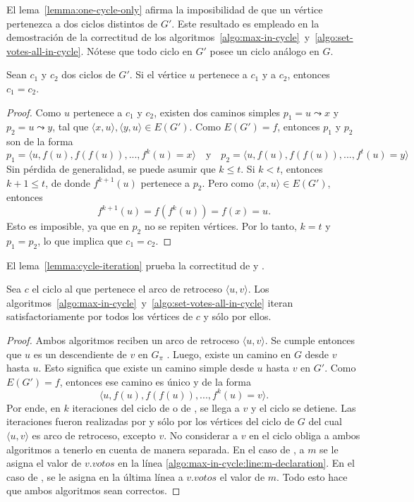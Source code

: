 El lema~\ref{lemma:one-cycle-only} afirma la imposibilidad de que un v\'ertice pertenezca a dos ciclos distintos de $G'$.  Este resultado es empleado en la demostraci\'on de la correctitud de los algoritmos~\ref{algo:max-in-cycle}~y~\ref{algo:set-votes-all-in-cycle}. N\'otese que todo ciclo en $G'$ posee un ciclo an\'alogo en $G$.
\begin{lemma}\label{lemma:one-cycle-only}
    Sean $c_1$ y $c_2$ dos ciclos de $G'$. Si el v\'ertice $u$ pertenece a $c_1$ y  a $c_2$, entonces $c_1 = c_2$.
\end{lemma}

\begin{proof}
    Como $u$ pertenece a $c_1$ y $c_2$, existen dos caminos simples $p_1 = u \leadsto x$ y $p_2 = u \leadsto y$, tal que $\langle x, u \rangle, \langle y, u \rangle \in E(G')$. Como $E(G') = f$, entonces $p_1$ y $p_2$ son de la forma
    $$
    p_1 = \langle u, f(u), f(f(u)), ..., f^k(u) = x \rangle \quad \text{y} \quad p_2 = \langle u, f(u), f(f(u)), ..., f^t(u) = y \rangle
    $$
    Sin p\'erdida de generalidad, se puede asumir que $k \leq t$. Si $k < t$, entonces $k+1 \leq t$, de donde $f^{k+1}(u)$ pertenece a $p_2$. Pero como $\langle x, u \rangle \in E(G')$, entonces
    $$
    f^{k+1}(u) = f(f^k(u)) = f(x) = u.
    $$
    Esto es imposible, ya que en $p_2$ no se repiten v\'ertices. Por lo tanto, $k = t$ y $p_1 = p_2$, lo que implica que $c_1 = c_2$.
\end{proof}

El lema~\ref{lemma:cycle-iteration} prueba la correctitud de \maxincyclecaption \;y \setvotestoallincyclecaption.

\begin{lemma}\label{lemma:cycle-iteration}
    Sea $c$ el ciclo al que pertenece el arco de retroceso $\langle u, v \rangle$. Los algoritmos~\ref{algo:max-in-cycle}~y~\ref{algo:set-votes-all-in-cycle} iteran satisfactoriamente por todos los v\'ertices de $c$ y s\'olo por ellos.
\end{lemma}

\begin{proof}
    Ambos algoritmos reciben un arco de retroceso $\langle u, v \rangle$. Se cumple entonces que $u$ es un descendiente de $v$ en $G_\pi$ \citep{intro-to-algo-3}. Luego, existe un camino en $G$ desde $v$ hasta $u$. Esto significa que existe  un camino simple desde $u$ hasta $v$ en $G'$. Como $E(G') = f$, entonces ese camino es \'unico y de la forma
    $$
    \langle u, f(u), f(f(u)), ..., f^k(u) = v \rangle.
    $$
    Por ende, en $k$ iteraciones del ciclo de \maxincyclecaption \;o de \setvotestoallincyclecaption, se llega a $v$ y el ciclo se detiene. Las iteraciones fueron realizadas  por y s\'olo por los v\'ertices del ciclo de $G$ del cual $\langle u, v \rangle$ es arco de retroceso, excepto $v$. No considerar a $v$ en el ciclo obliga a ambos algoritmos a tenerlo en cuenta de manera separada.  En el caso de \maxincyclecaption, a $m$ se le asigna el valor de $v.votos$ en la l\'inea \ref{algo:max-in-cycle:line:m-declaration}. En el caso de \setvotestoallincyclecaption, se le asigna en la \'ultima l\'inea a $v.votos$ el valor de $m$. Todo esto hace que ambos algoritmos sean correctos.
\end{proof}

